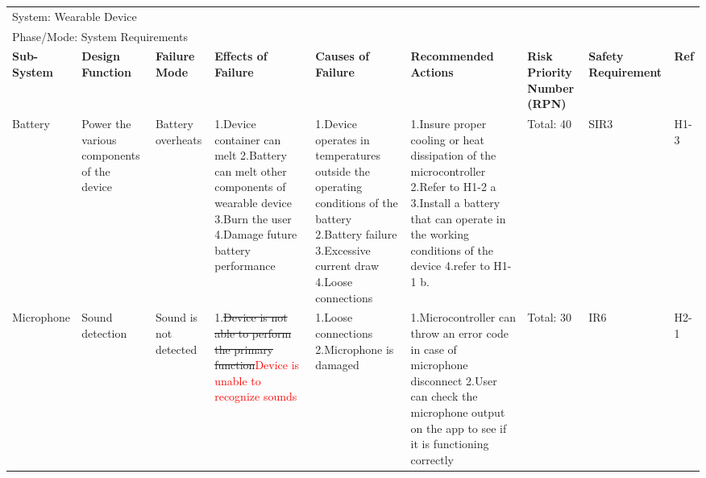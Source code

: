 \documentclass{article}
\begin{document}
\begin{landscape}
\begin{table}[H]
\begin{tabular}{| p{} | p{}  | p{} | p{} | p{} | p{} | p{} | p{} | p{} |}
    \end{tabular}
    \hspace*{-1cm}
\end{table}
    
\begin{table}[H]
    \centering
        
        \begin{tabular}{| p{} | p{}  | p{} | p{} | p{} | p{} | p{} | p{} | p{} |}
        \hline
        
        \multicolumn{9}{|l|}{System: Wearable Device} \\
        \multicolumn{9}{|l|}{Phase/Mode: System Requirements} \\ \hline
        \textbf{Sub-System} & \textbf{Design Function} & \textbf{Failure Mode} & \textbf{Effects of Failure} & \textbf{Causes of Failure} & \textbf{Recommended Actions} & \textbf{Risk Priority Number (RPN)} & \textbf{Safety Requirement} & \textbf{Ref} \\ \hline
    
        Battery & Power the various components of the device  &  Battery overheats & 1.Device container can melt \newline 2.Battery can melt other components of wearable device \newline 3.Burn the user \newline 4.Damage future battery performance & 1.Device operates in temperatures outside the operating conditions of the battery \newline 2.Battery failure \newline 3.Excessive current draw \newline 4.Loose connections  & 1.Insure proper cooling or heat dissipation of the microcontroller \newline 2.Refer to H1-2 a \newline 3.Install a battery that can operate in the working conditions of the device \newline 4.refer to H1-1 b. & Total: 40 & SIR3 & H1-3 \\ \hline
    
         Microphone & Sound detection & Sound is not detected & 1.\sout{Device is not able to perform the primary function}\textcolor{red}{Device is unable to recognize sounds}  & 1.Loose connections \newline 2.Microphone is damaged  & 1.Microcontroller can throw an error code in case of microphone disconnect \newline 2.User can check the microphone output on the app to see if it is functioning correctly & Total: 30  & IR6  & H2-1 \\ \cline{3-9}
    

\end{tabular}
\end{table}
\end{landscape}
\end{document}
